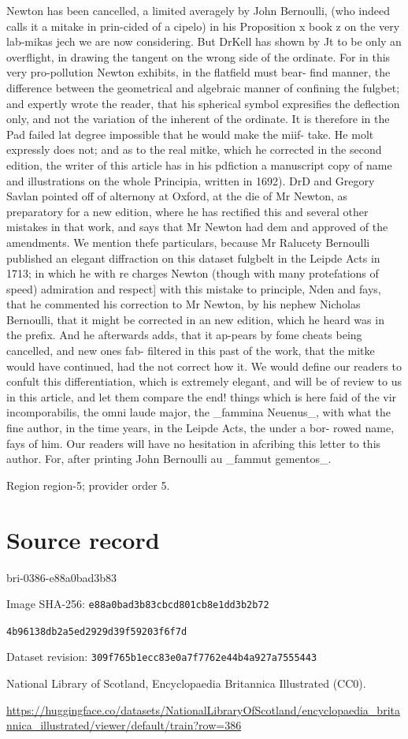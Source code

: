 \documentclass[11pt]{article}
\begin{document}
Newton has been cancelled, a limited averagely by John Bernoulli, (who indeed calls it a mitake in prin-cided of a cipelo) in his Proposition x book z on the very lab-mikas jech we are now considering. But DrKell has shown by Jt to be only an overflight, in drawing the tangent on the wrong side of the ordinate. For in this very pro-pollution Newton exhibits, in the flatfield must bear- find manner, the difference between the geometrical and algebraic manner of confining the fulgbet; and expertly wrote the reader, that his spherical symbol expresifies the deflection only, and not the variation of the inherent of the ordinate. It is therefore in the Pad failed lat degree impossible that he would make the miif- take. He molt expressly does not; and as to the real mitke, which he corrected in the second edition, the writer of this article has in his pdfiction a manuscript copy of name and illustrations on the whole Principia, written in 1692). DrD and Gregory Savlan pointed off of alternony at Oxford, at the die of Mr Newton, as preparatory for a new edition, where he has rectified this and several other mistakes in that work, and says that Mr Newton had dem and approved of the amendments. We mention thefe particulars, because Mr Ralucety Bernoulli published an elegant diffraction on this dataset fulgbelt in the Leipde Acts in 1713; in which he with re charges Newton (though with many protefations of speed) admiration and respect] with this mistake to principle, Nden and fays, that he commented his correction to Mr Newton, by his nephew Nicholas Bernoulli, that it might be corrected in an new edition, which he heard was in the prefix. And he afterwards adds, that it ap-pears by fome cheats being cancelled, and new ones fab- filtered in this past of the work, that the mitke would have continued, had the not correct how it. We would define our readers to confult this differentiation, which is extremely elegant, and will be of review to us in this article, and let them compare the end! things which is here faid of the vir incomporabilis, the omni laude major, the \_fammina Neuenus\_, with what the fine author, in the time years, in the Leipde Acts, the under a bor- rowed name, fays of him. Our readers will have no hesitation in afcribing this letter to this author. For, after printing John Bernoulli au \_fammut gementos\_.
\par

{\scriptsize\color{gray} Region region-5; provider order 5.\par}
\medskip
\newpage\section*{Source record}
bri-0386-e88a0bad3b83\par
Image SHA-256: \texttt{e88a0bad3b83cbcd801cb8e1dd3b2b72}\par\texttt{4b96138db2a5ed2929d39f59203f6f7d}\par
Dataset revision: \texttt{309f765b1ecc83e0a7f7}\texttt{762e44b4a927a7555443}\par
National Library of Scotland, Encyclopaedia Britannica Illustrated (CC0).\par
\url{https://huggingface.co/datasets/NationalLibraryOfScotland/encyclopaedia_britannica_illustrated/viewer/default/train?row=386}
\end{document}
